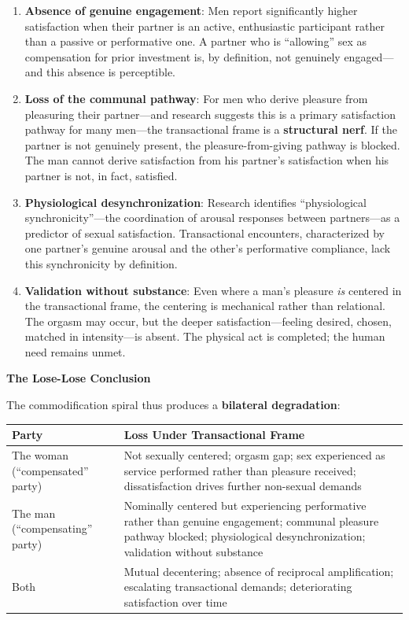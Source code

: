 \documentclass[12pt, letterpaper]{article}
\begin{document}
\begin{enumerate}
    \item \textbf{Absence of genuine engagement}: Men report significantly higher satisfaction when their partner is an active, enthusiastic participant rather than a passive or performative one. A partner who is ``allowing'' sex as compensation for prior investment is, by definition, not genuinely engaged---and this absence is perceptible.
    
    \item \textbf{Loss of the communal pathway}: For men who derive pleasure from pleasuring their partner---and research suggests this is a primary satisfaction pathway for many men---the transactional frame is a \textbf{structural nerf}. If the partner is not genuinely present, the pleasure-from-giving pathway is blocked. The man cannot derive satisfaction from his partner's satisfaction when his partner is not, in fact, satisfied.
    
    \item \textbf{Physiological desynchronization}: Research identifies ``physiological synchronicity''---the coordination of arousal responses between partners---as a predictor of sexual satisfaction. Transactional encounters, characterized by one partner's genuine arousal and the other's performative compliance, lack this synchronicity by definition.
    
    \item \textbf{Validation without substance}: Even where a man's pleasure \textit{is} centered in the transactional frame, the centering is mechanical rather than relational. The orgasm may occur, but the deeper satisfaction---feeling desired, chosen, matched in intensity---is absent. The physical act is completed; the human need remains unmet.
\end{enumerate}

\textbf{The Lose-Lose Conclusion}

The commodification spiral thus produces a \textbf{bilateral degradation}:

\begin{center}
\begin{tabular}{|p{2.5in}|p{3.5in}|}
\hline
\textbf{Party} & \textbf{Loss Under Transactional Frame} \\
\hline
The woman (``compensated'' party) & Not sexually centered; orgasm gap; sex experienced as service performed rather than pleasure received; dissatisfaction drives further non-sexual demands \\
\hline
The man (``compensating'' party) & Nominally centered but experiencing performative rather than genuine engagement; communal pleasure pathway blocked; physiological desynchronization; validation without substance \\
\hline
Both & Mutual decentering; absence of reciprocal amplification; escalating transactional demands; deteriorating satisfaction over time \\
\hline
\end{tabular}
\end{center}
\end{document}
